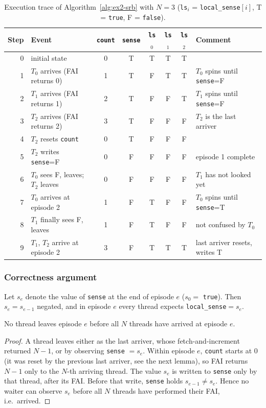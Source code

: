 \begin{table}[H]
\centering
\caption{Execution trace of Algorithm~\ref{alg:ex2-srb} with $N=3$
(\texttt{ls}$_i$ = \texttt{local\_sense}$[i]$, T = \texttt{true}, F =
\texttt{false}).}
\label{tab:ex2-trace}
\small
\begin{tabular}{r p{4.4cm} c c c c c p{3.9cm}}
\toprule
Step & Event & \texttt{count} & \texttt{sense} & \texttt{ls}$_0$ & \texttt{ls}$_1$ & \texttt{ls}$_2$ & Comment \\
\midrule
0  & initial state                    & 0 & T & T & T & T & \\
1  & $T_0$ arrives (FAI returns 0)    & 1 & T & F & T & T & $T_0$ spins until \texttt{sense}=F \\
2  & $T_1$ arrives (FAI returns 1)    & 2 & T & F & F & T & $T_1$ spins until \texttt{sense}=F \\
3  & $T_2$ arrives (FAI returns 2)    & 3 & T & F & F & F & $T_2$ is the last arriver \\
4  & $T_2$ resets \texttt{count}      & 0 & T & F & F & F & \\
5  & $T_2$ writes \texttt{sense}=F    & 0 & F & F & F & F & episode 1 complete \\
6  & $T_0$ sees F, leaves; $T_2$ leaves & 0 & F & F & F & F & $T_1$ has not looked yet \\
7  & $T_0$ arrives at episode 2       & 1 & F & T & F & F & $T_0$ spins until \texttt{sense}=T \\
8  & $T_1$ finally sees F, leaves     & 1 & F & T & F & F & not confused by $T_0$ \\
9  & $T_1$, $T_2$ arrive at episode 2 & 3 & F & T & T & T & last arriver resets, writes T \\
\bottomrule
\end{tabular}
\end{table}

\subsubsection{Correctness argument}
\label{sec:ex2-proof}

Let $s_e$ denote the value of \texttt{sense} at the end of episode $e$
($s_0 = $ \texttt{true}). Then $s_e = s_{e-1}$ negated, and in episode $e$
every thread expects \texttt{local\_sense}$ = s_e$.

\begin{lemma}[Safety]
No thread leaves episode $e$ before all $N$ threads have arrived at
episode $e$.
\end{lemma}
\begin{proof}
A thread leaves either as the last arriver, whose fetch-and-increment
returned $N-1$, or by observing \texttt{sense} $= s_e$. Within episode $e$,
\texttt{count} starts at $0$ (it was reset by the previous last arriver, see
the next lemma), so FAI returns $N-1$ only to the $N$-th arriving thread.
The value $s_e$ is written to \texttt{sense} only by that thread, after its
FAI. Before that write, \texttt{sense} holds $s_{e-1} \neq s_e$. Hence no
waiter can observe $s_e$ before all $N$ threads have performed their FAI,
i.e.\ arrived.
\end{proof}


